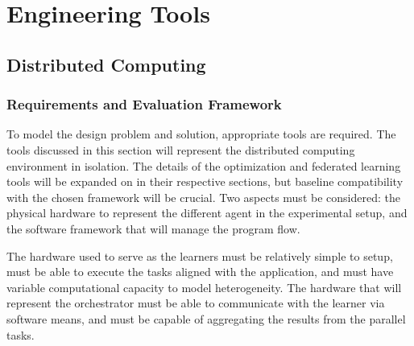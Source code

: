 \documentclass[../mthe-493-final-project.tex]{subfiles}
\begin{document}
    \chapter{Engineering Tools}
    \label{ch:engineering-tools}
    
    \section{Distributed Computing}
    \label{sec:distributed-computing-engineering-tools}
    
    \subsection{Requirements and Evaluation Framework}
    To model the design problem and solution, appropriate tools are required. The tools discussed in this section will represent the distributed computing environment in isolation. The details of the optimization and federated learning tools will be expanded on in their respective sections, but baseline compatibility with the chosen framework will be crucial. Two aspects must be considered: the physical hardware to represent the different agent in the experimental setup, and the software framework that will manage the program flow. 
    
    The hardware used to serve as the learners must be relatively simple to setup, must be able to execute the tasks aligned with the application, and must have variable computational capacity to model heterogeneity. The hardware that will represent the orchestrator must be able to communicate with the learner via software means, and must be capable of aggregating the results from the parallel tasks.
    
\end{document}
